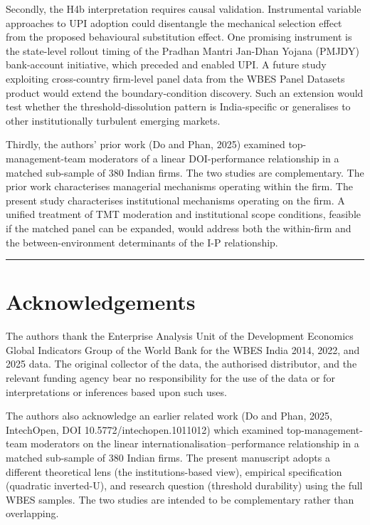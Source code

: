 \documentclass[
  12pt]{article}
\begin{document}
Secondly, the H4b interpretation requires causal validation.
Instrumental variable approaches to UPI adoption could disentangle the
mechanical selection effect from the proposed behavioural substitution
effect. One promising instrument is the state-level rollout timing of
the Pradhan Mantri Jan-Dhan Yojana (PMJDY) bank-account initiative,
which preceded and enabled UPI. A future study exploiting cross-country
firm-level panel data from the WBES Panel Datasets product would extend
the boundary-condition discovery. Such an extension would test whether
the threshold-dissolution pattern is India-specific or generalises to
other institutionally turbulent emerging markets.

Thirdly, the authors' prior work (Do and Phan, 2025) examined
top-management-team moderators of a linear DOI-performance relationship
in a matched sub-sample of 380 Indian firms. The two studies are
complementary. The prior work characterises managerial mechanisms
operating within the firm. The present study characterises institutional
mechanisms operating on the firm. A unified treatment of TMT moderation
and institutional scope conditions, feasible if the matched panel can be
expanded, would address both the within-firm and the between-environment
determinants of the I-P relationship.

\begin{center}\rule{0.5\linewidth}{0.5pt}\end{center}

\hypertarget{acknowledgements}{%
\section{Acknowledgements}\label{acknowledgements}}

The authors thank the Enterprise Analysis Unit of the Development
Economics Global Indicators Group of the World Bank for the WBES India
2014, 2022, and 2025 data. The original collector of the data, the
authorised distributor, and the relevant funding agency bear no
responsibility for the use of the data or for interpretations or
inferences based upon such uses.

The authors also acknowledge an earlier related work (Do and Phan, 2025,
IntechOpen, DOI 10.5772/intechopen.1011012) which examined
top-management-team moderators on the linear
internationalisation--performance relationship in a matched sub-sample
of 380 Indian firms. The present manuscript adopts a different
theoretical lens (the institutions-based view), empirical specification
(quadratic inverted-U), and research question (threshold durability)
using the full WBES samples. The two studies are intended to be
complementary rather than overlapping.
\end{document}
